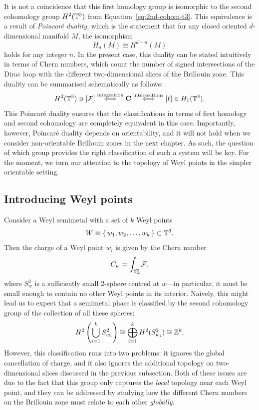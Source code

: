 It is not a coincidence that this first homology group is isomorphic to the second cohomology group $H^2(\mathbb{T}^3)$ from Equation~\eqref{eq:2nd-cohom-t3}. This equivalence is a result of \emph{Poincar\'e duality}, which is the statement that for any closed oriented $d$-dimensional manifold $M$, the isomorphism
\[
	H_n(M) \cong H^{d-n}(M)
\]
holds for any integer $n$. In the present case, this duality can be stated intuitively in terms of Chern numbers, which count the number of signed intersections of the Dirac loop with the different two-dimensional slices of the Brillouin zone. This duality can be summarised schematically as follows:
\begin{equation}\label{eq:duality-scheme}
	H^2(\T^3) \ni [\Fc] \overset{\rm integration}{\iff} %
	\vb{C} \overset{\rm intersections}{\iff} [\ell] \in H_1(\T^3).
\end{equation}
This Poincar\'e duality ensures that the classifications in terms of first homology and second cohomology are completely equivalent in this case. Importantly, however, Poincar\'e duality depends on orientability, and it will not hold when we consider non-orientable Brillouin zones in the next chapter. As such, the question of which group provides the right classification of such a system will be key. For the moment, we turn our attention to the topology of Weyl points in the simpler orientable setting.


\subsection{Introducing Weyl points}\label{sec:Weyl-point-topology}

Consider a Weyl semimetal with a set of $k$ Weyl points
\[
	W \equiv \set{w_1,w_2,\ldots,w_k}\subset \mathbb{T}^3.
\]
Then the charge of a Weyl point $w_i$ is given by the Chern number
\begin{equation}
	C_w = \int_{S_w^2}\!\mathcal{F},
\end{equation}
where $S_w^2$ is a sufficiently small 2-sphere centred at $w$---in particular, it must be small enough to contain no other Weyl points in its interior. Naively, this might lead us to expect that a semimetal phase is classified by the second cohomology group of the collection of all these spheres:
\begin{equation}\label{eq:2nd-cohom-spheres}
	H^2\left(\bigcup_{i=1}^k S_{w_i}^2\right)\cong \bigoplus_{i=1}^k H^2(S_{w_i}^2) \cong \mathbb{Z}^k.
\end{equation}
However, this classification runs into two problems: it ignores the global cancellation of charge, and it also ignores the additional topology on two-dimensional slices discussed in the previous subsection. Both of these issues are due to the fact that this group only captures the \emph{local} topology near each Weyl point, and they can be addressed by studying how the different Chern numbers on the Brillouin zone must relate to each other \emph{globally}.

